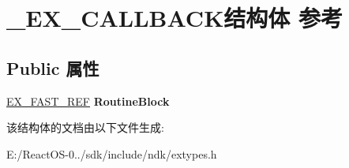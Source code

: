 \hypertarget{struct___e_x___c_a_l_l_b_a_c_k}{}\section{\+\_\+\+E\+X\+\_\+\+C\+A\+L\+L\+B\+A\+C\+K结构体 参考}
\label{struct___e_x___c_a_l_l_b_a_c_k}
\subsection*{Public 属性}
\begin{DoxyCompactItemize}
\item 
\mbox{\label{struct___e_x___c_a_l_l_b_a_c_k_a59252e3815c65b662cd2150111af3251}} 
\hyperlink{struct___e_x___f_a_s_t___r_e_f}{E\+X\+\_\+\+F\+A\+S\+T\+\_\+\+R\+EF} {\bfseries Routine\+Block}
\end{DoxyCompactItemize}


该结构体的文档由以下文件生成\+:\begin{DoxyCompactItemize}
\item 
E\+:/\+React\+O\+S-\/0../sdk/include/ndk/extypes.\+h\end{DoxyCompactItemize}
